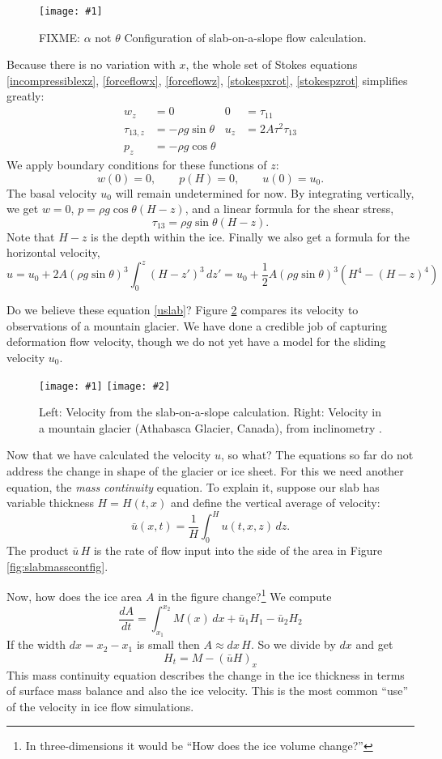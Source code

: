 \documentclass[titlepage,letterpaper,final,12pt]{scrartcl}
\newcommand{\onefigsize}[3]{
\begin{figure}[ht]
\centering
\texttt{[image: \#1]}
\caption{#2}
\label{fig:#1}
\end{figure}}
\newcommand{\onefig}[2]{\onefigsize{#1}{#2}{3.0in}}
\newcommand{\twofigsizes}[5]{
\begin{figure}[ht]
\centering
\texttt{[image: \#1]} \quad
\texttt{[image: \#2]}
\caption{#3}
\label{fig:#1}
\end{figure}}
\begin{document}
\onefig{slab}{FIXME: $\alpha$ not $\theta$  Configuration of slab-on-a-slope flow calculation.}

Because there is no variation with $x$, the whole set of Stokes equations \eqref{incompressiblexz}, \eqref{forceflowx}, \eqref{forceflowz}, \eqref{stokespxrot}, \eqref{stokespzrot} simplifies greatly:
\begin{align*}
w_z &= 0 &   0 &= \tau_{11} \\
\tau_{13,z} &= - \rho g \sin\theta &   u_z &= 2 A \tau^2 \tau_{13} \\
p_z &= - \rho g \cos\theta
\end{align*}
We apply boundary conditions for these functions of $z$:
	$$w(0)=0, \qquad p(H)=0, \qquad u(0)=u_0.$$
The basal velocity $u_0$ will remain undetermined for now.  By integrating vertically, we get $w=0$, $p = \rho g \cos\theta (H-z)$, and a linear formula for the shear stress,
	$$\tau_{13} = \rho g \sin\theta (H-z).$$
Note that $H-z$ is the depth within the ice.  Finally we also get a formula for the horizontal velocity,
\begin{equation}
u = u_0 + 2 A (\rho g \sin\theta)^3 \int_0^z (H-z')^3\,dz' = u_0 + \frac{1}{2} A (\rho g \sin\theta)^3  \left(H^4 - (H-z)^4\right) \label{uslab}
\end{equation}

Do we believe these equation \eqref{uslab}?  Figure \ref{fig:slabvel} compares its velocity to observations of a mountain glacier.  We have done a credible job of capturing deformation flow velocity, though we do not yet have a model for the sliding velocity $u_0$.  

\twofigsizes{slabvel}{athabasca_deform}{Left:  Velocity from the slab-on-a-slope calculation.  Right:  Velocity in a mountain glacier (Athabasca Glacier, Canada), from inclinometry \cite{SavagePaterson}.}{2.2in}{2.0in}

Now that we have calculated the velocity $u$, so what?  The equations so far do not address the change in shape of the glacier or ice sheet.  For this we need another equation, the \emph{mass continuity} equation.  To explain it, suppose our slab has variable thickness $H=H(t,x)$ and define the vertical average of velocity:
	$$\bar u(x,t) = \frac{1}{H}\int_0^{H} u(t,x,z)\,dz.$$
The product $\bar u\, H$ is the rate of flow input into the side of the area in Figure \ref{fig:slabmasscontfig}.

Now, how does the ice area $A$ in the figure change?\footnote{In three-dimensions it would be ``How does the ice volume change?''}  We compute
	$$\frac{dA}{dt} = \int_{x_1}^{x_2} M(x)\,dx + \bar u_1 H_1 - \bar u_2 H_2$$
If the width $dx=x_2-x_1$ is small then $A\approx dx\, H$.  So we divide by $dx$ and get
\begin{equation}
H_t = M - \left(\bar u H\right)_x \label{masscont1D}
\end{equation}
This mass continuity equation describes the change in the ice thickness in terms of surface mass balance and also the ice velocity.  This is the most common ``use'' of the velocity in ice flow simulations.
\end{document}
